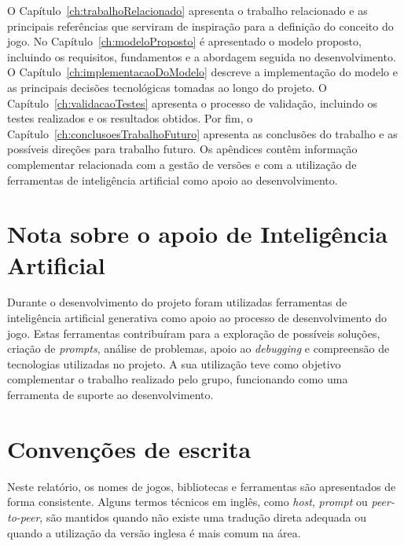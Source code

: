 O Capítulo~\ref{ch:trabalhoRelacionado} apresenta o trabalho relacionado e as principais referências que serviram de inspiração para a definição do conceito do jogo. No Capítulo~\ref{ch:modeloProposto} é apresentado o modelo proposto, incluindo os requisitos, fundamentos e a abordagem seguida no desenvolvimento. O Capítulo~\ref{ch:implementacaoDoModelo} descreve a implementação do modelo e as principais decisões tecnológicas tomadas ao longo do projeto. O Capítulo~\ref{ch:validacaoTestes} apresenta o processo de validação, incluindo os testes realizados e os resultados obtidos. Por fim, o Capítulo~\ref{ch:conclusoesTrabalhoFuturo} apresenta as conclusões do trabalho e as possíveis direções para trabalho futuro. Os apêndices contêm informação complementar relacionada com a gestão de versões e com a utilização de ferramentas de inteligência artificial como apoio ao desenvolvimento.


\section{Nota sobre o apoio de Inteligência Artificial}
\label{sec:notaIA}

Durante o desenvolvimento do projeto foram utilizadas ferramentas de inteligência artificial generativa como apoio ao processo de desenvolvimento do jogo. Estas ferramentas contribuíram para a exploração de possíveis soluções, criação de \textit{prompts}, análise de problemas, apoio ao \textit{debugging} e compreensão de tecnologias utilizadas no projeto. A sua utilização teve como objetivo complementar o trabalho realizado pelo grupo, funcionando como uma ferramenta de suporte ao desenvolvimento.


\section{Convenções de escrita}
\label{sec:convencoes}

Neste relatório, os nomes de jogos, bibliotecas e ferramentas são apresentados de forma consistente. Alguns termos técnicos em inglês, como \textit{host}, \textit{prompt} ou \textit{peer-to-peer}, são mantidos quando não existe uma tradução direta adequada ou quando a utilização da versão inglesa é mais comum na área.




